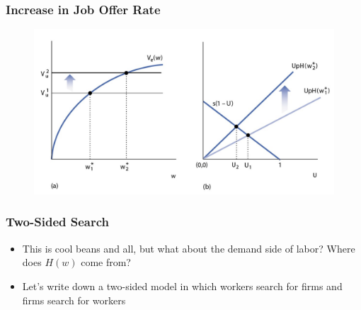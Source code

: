 \documentclass{beamer}
\begin{document}
\begin{frame}
\frametitle[alignment=center]{Increase in Job Offer Rate}
\begin{figure}
\centering
\includegraphics[scale=0.5]{Figures/W_Fig_6pt16.png}
\end{figure}
\end{frame}

\begin{frame}
\frametitle[alignment=center]{Two-Sided Search}
\begin{itemize}
\item This is cool beans and all, but what about the demand side of labor?  Where does $H(w)$ come from?  
\bigskip
\item Let's write down a two-sided model in which workers search for firms and firms search for workers
\end{itemize}
\end{frame}
\end{document}
